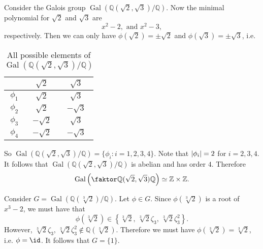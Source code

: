 \documentclass[notoc,notitlepage,nobib]{tufte-book}
\DeclareMathOperator{\Gal}{Gal}
\begin{document}
\begin{eg}
  Consider the Galois group $\Gal( \mathbb{Q}(\sqrt{2}, \sqrt{3}) / \mathbb{Q}
  )$. Now the minimal polynomial for $\sqrt{2}$ and $\sqrt{3}$ are
  \begin{equation*}
    x^2 - 2, \text{ and } x^2 - 3,
  \end{equation*}
  respectively. Then we can only have $\phi(\sqrt{2}) = \pm \sqrt{2}$ and
  $\phi(\sqrt{3}) = \pm \sqrt{3}$, i.e.
  \begin{table}[ht]
    \centering
    \caption{All possible elements of $\Gal(\mathbb{Q}(\sqrt{2}, \sqrt{3}) /
    \mathbb{Q})$}
    \label{table:all_possible_elements_of_gal_q_sqrt_2_sqrt_3_q}
    \begin{tabular}{c | c c}
               & $\sqrt{2}$  & $\sqrt{3}$ \\
       \hline
      $\phi_1$ & $\sqrt{2}$  & $\sqrt{3}$ \\
      $\phi_2$ & $\sqrt{2}$  & $-\sqrt{3}$ \\
      $\phi_3$ & $-\sqrt{2}$ & $\sqrt{3}$ \\
      $\phi_4$ & $-\sqrt{2}$ & $-\sqrt{3}$
    \end{tabular}
  \end{table}
  So $\Gal( \mathbb{Q}(\sqrt{2}, \sqrt{3}) / \mathbb{Q} ) = \{ \phi_i : i = 1,
  2, 3, 4 \}$. Note that $\left|\phi_i\right| = 2$ for $i = 2, 3, 4$. It follows that
  $\Gal( \mathbb{Q}(\sqrt{2}, \sqrt{3}) / \mathbb{Q} )$ is abelian and has order
  $4$. Therefore
  \begin{equation*}
    \Gal \left( \quotient{\mathbb{Q}(\sqrt{2}, \sqrt{3})}{\mathbb{Q}} \right)
    \simeq \mathbb{Z} \times \mathbb{Z}.
  \end{equation*}
\end{eg}


\begin{eg}\label{eg:galois_elements_can_only_permute_roots_in_the_same_field}
  Consider $G = \Gal(\mathbb{Q}(\sqrt[3]{2}) / \mathbb{Q})$. Let $\phi \in G$.
  Since $\phi(\sqrt[3]{2})$ is a root of $x^3 - 2$, we must have that
  \begin{equation*}
    \phi(\sqrt[3]{2}) \in \left\{ \sqrt[3]{2}, \, \sqrt[3]{2} \zeta_3, \,
    \sqrt[3]{2} \zeta_3^2 \right\}.
  \end{equation*}
  However, $\sqrt[3]{2} \zeta_3, \, \sqrt[3]{2} \zeta_3^2 \notin
  \mathbb{Q}(\sqrt[3]{2})$. Therefore we must have $\phi(\sqrt[3]{2}) =
  \sqrt[3]{2}$, i.e. $\phi = \id$. It follows that $G = \{ 1 \}$.
\end{eg} 
\end{document}

